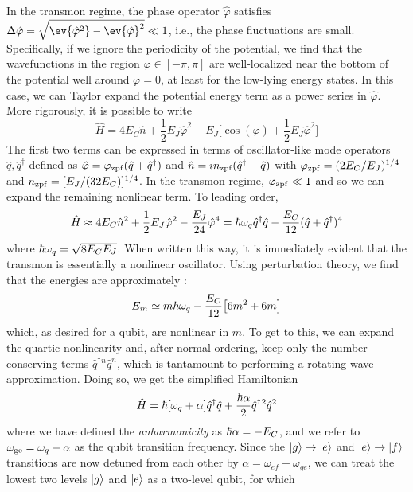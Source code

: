 In the transmon regime, the phase operator $\hat{\varphi}$ satisfies $\Delta\hat{\varphi} = \sqrt{\ev{\hat{\varphi}^2} - \ev{\hat{\varphi}}^2} \ll 1$, i.e., the phase fluctuations are small. Specifically, if we ignore the periodicity of the potential, we find that the wavefunctions in the region $\varphi \in [-\pi, \pi]$ are well-localized near the bottom of the potential well around $\varphi = 0$, at least for the low-lying energy states. In this case, we can Taylor expand the potential energy term as a power series in $\hat{\varphi}$. More rigorously, it is possible to write  
\begin{equation}
    \hat{H} = 4E_C\hat{n} + \frac{1}{2}E_J \hat{\varphi}^2 - E_J\bigg[\cos(\hat{\varphi}) + \frac{1}{2}E_J \hat{\varphi}^2\bigg]
\end{equation}
The first two terms can be expressed in terms of oscillator-like mode operators $\hat{q}, \hat{q}^\dagger$ defined as $\hat{\varphi} = \varphi_{\rm zpf}(\hat{q} + \hat{q}^\dagger)$ and $\hat{n} = in_{\rm zpf}(\hat{q}^\dagger - \hat{q})$ with $\varphi_{\rm zpf} = (2E_C/E_J)^{1/4}$ and $n_{\rm zpf} =  [E_J/(32E_C)]^{1/4}$. In the transmon regime, $\varphi_{\rm zpf} \ll 1$ and so we can expand the remaining nonlinear term. To leading order,
\begin{equation}
    \hat{H} \approx 4E_C\hat{n}^2 + \frac{1}{2}E_J \hat{\varphi}^2 - \frac{E_J}{24}\hat{\varphi}^4 = \hbar\omega_q \hat{q}^\dagger \hat{q} - \frac{E_C}{12}(\hat{q} + \hat{q}^\dagger)^4
    \label{eq:transmon_duffing_H}
\end{equation}
where $\hbar\omega_q = \sqrt{8 E_C E_J}$. When written this way, it is immediately evident that the transmon is essentially a nonlinear oscillator. Using perturbation theory, we find that the energies are approximately \cite{bishop2010circuit}:
\begin{equation}
    E_m \simeq m\hbar\omega_q - \frac{E_C}{12}\big[6m^2 + 6m\big]
\end{equation}
which, as desired for a qubit, are nonlinear in $m$. To get to this, we can expand the quartic nonlinearity and, after normal ordering, keep only the number-conserving terms $\hat{q}^\dagger{}^n\hat{q}^n$, which is tantamount to performing a rotating-wave approximation. Doing so, we get the simplified Hamiltonian
\begin{equation}
    \hat{H} = \hbar[\omega_q + \alpha]\hat{q}^\dagger \hat{q} + \frac{\hbar\alpha}{2}\hat{q}^\dagger{}^2\hat{q}^2
\end{equation}
where we have defined the \textit{anharmonicity} as $\hbar\alpha = -E_C$, and we refer to $\omega_{\rm ge} = \omega_q + \alpha$ as the qubit transition frequency. Since the $\lvert g\rangle\to\lvert e\rangle$ and $\lvert e\rangle\to\lvert f\rangle$ transitions are now detuned from each other by $\alpha = \omega_{ef}-\omega_{ge}$, we can treat the lowest two levels $\lvert g\rangle$ and $\lvert e\rangle$ as a two-level qubit, for which
